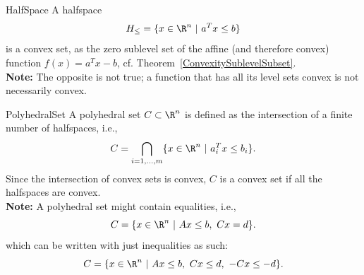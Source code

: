 \begin{ex}[Halfspace]{HalfSpace}
    A halfspace 
    \begin{equation*}
        H_{\leq} = \{ x \in \R^n \ | \ a^T x \leq b \}
    \end{equation*}
    is a convex set, as the zero sublevel set of the affine (and therefore convex) function $f(x) = a^T x - b$, cf. Theorem~\ref{ConvexitySublevelSubset}. \\

    \textbf{Note:} The opposite is not true; a function that has all its level sets convex is not necessarily convex.
\end{ex}

\newpage

\begin{ex}{PolyhedralSet}
    A polyhedral set $C \subset \R^n$ is defined as the intersection of a finite number of halfspaces, i\@.e\@.,
    \begin{equation*}
        C = \bigcap_{i= 1, \ldots, m} \{ x \in \R^n \ | \ a_i^T x \leq b_i \}.
    \end{equation*}
    Since the intersection of convex sets is convex, $C$ is a convex set if all the halfspaces are convex. \\

    \textbf{Note:} A polyhedral set might contain equalities, i\@.e\@., 
    \begin{equation*}
        C = \{ x \in \R^n \ | \ Ax \leq b, \ Cx = d \}.
    \end{equation*}
    which can be written with just inequalities as such:
    \begin{equation*}
        C = \{ x \in \R^n \ | \ Ax \leq b, \ Cx \leq d, \ -Cx \leq -d \}.
    \end{equation*}
    \vspace*{-0.5cm}
\end{ex}

